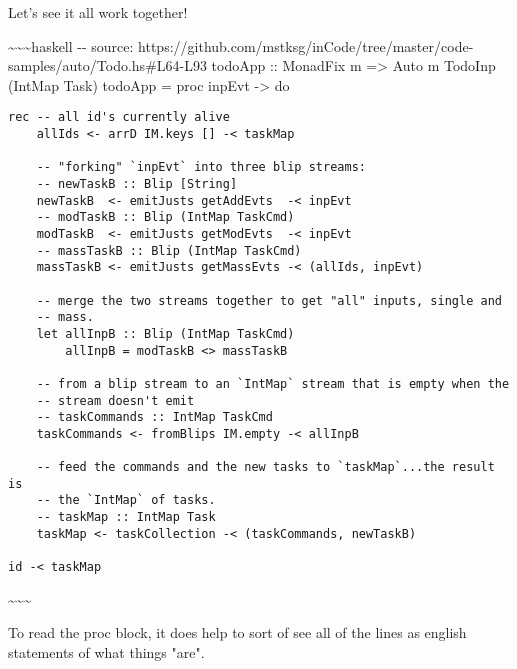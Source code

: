 \documentclass[]{article}
\begin{document}
Let's see it all work together!

\textasciitilde{}\textasciitilde{}\textasciitilde{}haskell -\/- source:
https://github.com/mstksg/inCode/tree/master/code-samples/auto/Todo.hs\#L64-L93
todoApp :: MonadFix m =\textgreater{} Auto m TodoInp (IntMap Task) todoApp =
proc inpEvt -\textgreater{} do

\begin{verbatim}
rec -- all id's currently alive
    allIds <- arrD IM.keys [] -< taskMap

    -- "forking" `inpEvt` into three blip streams:
    -- newTaskB :: Blip [String]
    newTaskB  <- emitJusts getAddEvts  -< inpEvt
    -- modTaskB :: Blip (IntMap TaskCmd)
    modTaskB  <- emitJusts getModEvts  -< inpEvt
    -- massTaskB :: Blip (IntMap TaskCmd)
    massTaskB <- emitJusts getMassEvts -< (allIds, inpEvt)

    -- merge the two streams together to get "all" inputs, single and
    -- mass.
    let allInpB :: Blip (IntMap TaskCmd)
        allInpB = modTaskB <> massTaskB

    -- from a blip stream to an `IntMap` stream that is empty when the
    -- stream doesn't emit
    -- taskCommands :: IntMap TaskCmd
    taskCommands <- fromBlips IM.empty -< allInpB

    -- feed the commands and the new tasks to `taskMap`...the result is
    -- the `IntMap` of tasks.
    -- taskMap :: IntMap Task
    taskMap <- taskCollection -< (taskCommands, newTaskB)

id -< taskMap
\end{verbatim}

\textasciitilde{}\textasciitilde{}\textasciitilde{}

To read the proc block, it does help to sort of see all of the lines as english
statements of what things "are".
\end{document}
